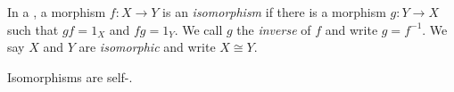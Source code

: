 


\begin{dfn*}[Isomorphism]
	In a , a morphism $f: X\rightarrow Y$ is an \emph{isomorphism} if
	there is a morphism $g: Y\rightarrow X$ such that $gf = 1_X$ and $fg = 1_Y$.
	We call $g$ the \emph{inverse} of $f$ and write $g = f^{-1}$. We say $X$ and
	$Y$ are \emph{isomorphic} and write $X\cong Y$.
\end{dfn*}

Isomorphisms are self-.


